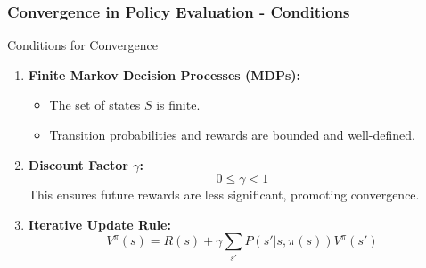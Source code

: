\documentclass[aspectratio=169]{beamer}
\begin{document}
\begin{frame}[fragile]
    \frametitle{Convergence in Policy Evaluation - Conditions}
    \begin{block}{Conditions for Convergence}
        \begin{enumerate}
            \item \textbf{Finite Markov Decision Processes (MDPs):}
                \begin{itemize}
                    \item The set of states \( S \) is finite.
                    \item Transition probabilities and rewards are bounded and well-defined.
                \end{itemize}

            \item \textbf{Discount Factor \( \gamma \):}
                \begin{equation}
                0 \leq \gamma < 1
                \end{equation}
                This ensures future rewards are less significant, promoting convergence.
    
            \item \textbf{Iterative Update Rule:}
                \begin{equation}
                V^{\pi}(s) = R(s) + \gamma \sum_{s'} P(s' | s, \pi(s)) V^{\pi}(s')
                \end{equation}
        \end{enumerate}
    \end{block}
\end{frame}
\end{document}
